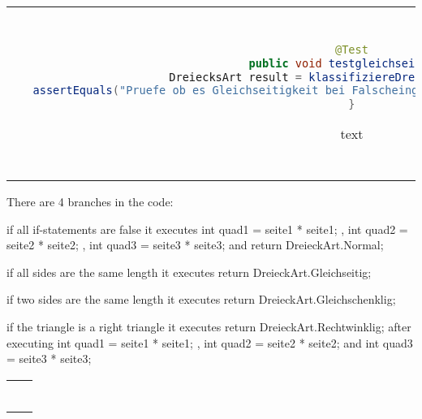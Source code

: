 \begin{parlist}
\begin{center}
\begin{tabular}{ | c | c | }
\begin{lstlisting}[language=java,frame=trBL]
@Test
public void testgleichseitig(){
   DreiecksArt result = klassifiziereDreieck(null,null,null);
   assertEquals("Pruefe ob es Gleichseitigkeit bei Falscheingabe erkennt", DriecksArt.Normal, result);
}
  \end{lstlisting} text& Need to check if it will recognize equallateral triangles even if it has bad input. \\
\end{tabular}
\end{center}

\item There are 4 branches in the code:
\begin{list}
\item if all if-statements are false it executes int quad1 = seite1 * seite1; , int quad2 = seite2 * seite2; , int quad3 = seite3 * seite3; and return DreieckArt.Normal; 
\item if all sides are the same length it executes return DreieckArt.Gleichseitig;
\item if two sides are the same length it executes return DreieckArt.Gleichschenklig;
\item if the triangle is a right triangle it executes return DreieckArt.Rechtwinklig; after executing int quad1 = seite1 * seite1; , int quad2 = seite2 * seite2; and int quad3 = seite3 * seite3;
\end{list}

\begin{center}
\begin{tabular}{ | c | c | } 
  \hline
  \begin{lstlisting}[language=java,frame=trBL]


\end{lstlisting}
\end{tabular}
\end{center}
\end{parlist}
